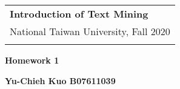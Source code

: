 \documentclass[a4paper,12pt]{article}
\begin{document}
\thispagestyle{plain} %

\begin{tabular}{p{15.5cm}} %
{\large \bf Introduction of Text Mining} \\
National Taiwan University, Fall 2020  \\
\hline %
\\
\end{tabular} %

\vspace*{0.3cm} %

\begin{center} %
	{\Large \bf Homework 1} %
	\vspace{2mm}
	
	{\bf Yu-Chieh Kuo B07611039} %
		
\end{center}  
\vspace{0.4cm}
\end{document}

